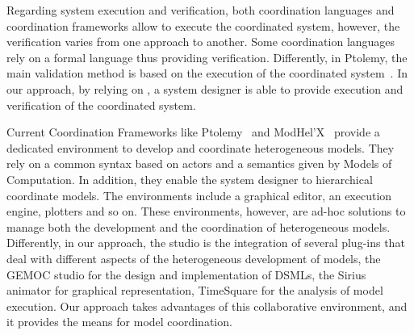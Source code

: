 Regarding system execution and verification, both coordination languages and coordination frameworks allow to execute the coordinated system, however, the verification varies from one approach to another. Some coordination languages rely on a formal language thus providing verification. Differently, in Ptolemy, the main validation method is based on the execution of the coordinated system~\cite{ptoleframebib}. In our approach, by relying on \ccsl, a system designer is able to provide execution and verification of the coordinated system.

Current Coordination Frameworks like Ptolemy~\cite{ptoleframebib} and ModHel'X~\cite{modhelxbib} provide a dedicated environment to develop and coordinate heterogeneous models. They rely on a common syntax based on actors and a semantics given by Models of Computation. In addition, they enable the system designer to hierarchical coordinate models. The environments include a graphical editor, an execution engine, plotters and so on. These environments, however, are ad-hoc solutions to manage both the development and the coordination of heterogeneous models. Differently, in our approach, the studio is the integration of several plug-ins that deal with different aspects of the heterogeneous development of models, \eg the GEMOC studio for the design and implementation of DSMLs, the Sirius animator for graphical representation, TimeSquare for the analysis of model execution. Our approach takes advantages of this collaborative environment, and it provides the means for model coordination.
